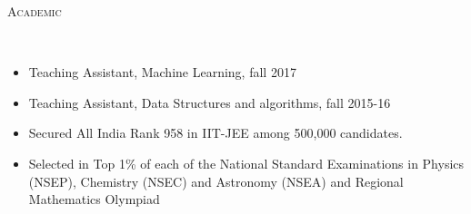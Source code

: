 \documentclass[9pt]{article}
\newenvironment{changemargin}[2]{%
  \begin{list}{}{%
    \setlength{\topsep}{0pt}%
    \setlength{\leftmargin}{#1}%
    \setlength{\rightmargin}{#2}%
    \setlength{\listparindent}{\parindent}%
    \setlength{\itemindent}{\parindent}%
    \setlength{\parsep}{\parskip}%
  }%
  \item[]}{\end{list}
}
\newcommand{\lineover}{
	\begin{changemargin}{-0.05in}{-0.10in}
		\vspace*{-9pt}
		\hrulefill \\
		\vspace*{-2pt}
	\end{changemargin}
}
\newcommand{\header}[1]{
	\begin{changemargin}{-0.5in}{-0.5in}
		\scshape{#1}\\
  	\lineover
	\end{changemargin}
}
\newenvironment{body} {
	\vspace*{-16pt}
	\begin{changemargin}{-0.6in}{-0.65in}
  }	
	{\end{changemargin}
}
\begin{document}

	  

\header{Academic}
\begin{body}
	\vspace{14pt}
	\begin{changemargin}{0.15in}{0.15in}
	\begin{itemize}
	  \item Teaching Assistant, Machine Learning, fall 2017
	  \item Teaching Assistant, Data Structures and algorithms, fall 2015-16
	  \item Secured All India Rank 958 in IIT-JEE among 500,000 candidates.
	  \item Selected in Top 1\% of each of the National Standard Examinations in Physics (NSEP), Chemistry (NSEC) and Astronomy (NSEA) and Regional Mathematics Olympiad
	\end{itemize}
	\end{changemargin}
\end{body}
\end{document}
